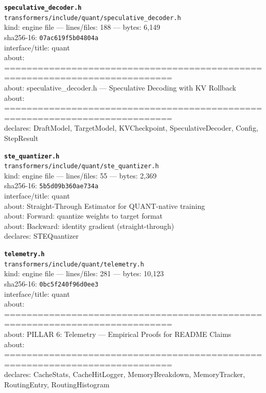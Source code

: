 \noindent\textbf{\texttt{speculative\_decoder.h}}\\
\texttt{transformers/include/quant/speculative\_decoder.h}\\
kind: engine file --- lines/files: 188 --- bytes: 6,149\\
sha256-16: \texttt{07ac619f5b04804a}\\
interface/title: quant\\
about: ============================================================================\\
about: speculative\_decoder.h — Speculative Decoding with KV Rollback\\
about: ============================================================================\\
declares: DraftModel, TargetModel, KVCheckpoint, SpeculativeDecoder, Config, StepResult\\
\vspace*{6.0pt}

\noindent\textbf{\texttt{ste\_quantizer.h}}\\
\texttt{transformers/include/quant/ste\_quantizer.h}\\
kind: engine file --- lines/files: 55 --- bytes: 2,369\\
sha256-16: \texttt{5b5d09b360ae734a}\\
interface/title: quant\\
about: Straight-Through Estimator for QUANT-native training\\
about: Forward: quantize weights to target format\\
about: Backward: identity gradient (straight-through)\\
declares: STEQuantizer\\
\vspace*{6.0pt}

\noindent\textbf{\texttt{telemetry.h}}\\
\texttt{transformers/include/quant/telemetry.h}\\
kind: engine file --- lines/files: 281 --- bytes: 10,123\\
sha256-16: \texttt{0bc5f240f96d0ee3}\\
interface/title: quant\\
about: ============================================================================\\
about: PILLAR 6: Telemetry — Empirical Proofs for README Claims\\
about: ============================================================================\\
declares: CacheStats, CacheHitLogger, MemoryBreakdown, MemoryTracker, RoutingEntry, RoutingHistogram\\
\vspace*{6.0pt}


